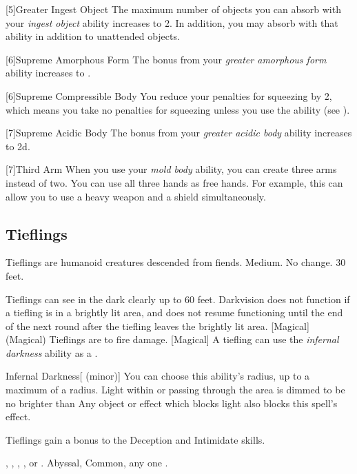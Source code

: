             [5]{Greater Ingest Object} The maximum number of objects you can absorb with your \textit{ingest object} ability increases to 2.
            In addition, you may absorb  with that ability in addition to unattended objects.

            [6]{Supreme Amorphous Form} The bonus from your \textit{greater amorphous form} ability increases to .

            [6]{Supreme Compressible Body} You reduce your penalties for squeezing by 2, which means you take no penalties for squeezing unless you use the  ability (see ).

            [7]{Supreme Acidic Body} The bonus from your \textit{greater acidic body} ability increases to \plus2d.

            [7]{Third Arm} When you use your \textit{mold body} ability, you can create three arms instead of two.
            You can use all three hands as free hands.
            For example, this can allow you to use a heavy weapon and a shield simultaneously.

    \subsection{Tieflings}

        Tieflings are humanoid creatures descended from fiends.
         Medium.
         No change.
         30 feet.
        \begin{itemize}
             Tieflings can see in the dark clearly up to 60 feet. Darkvision does not function if a tiefling is in a brightly lit area, and does not resume functioning until the end of the next round after the tiefling leaves the brightly lit area.
            [Magical] (Magical) Tieflings are  to fire damage.
            [Magical] A tiefling can use the \textit{infernal darkness} ability as a .
                \begin{durationability}{Infernal Darkness}[ (minor)]
                    \rankline
                    You can choose this ability's radius, up to a maximum of a \areamed radius.
                    Light within or passing through the area is dimmed to be no brighter than 
                    Any object or effect which blocks light also blocks this spell's effect.
                \end{durationability}
             Tieflings gain a  bonus to the Deception and Intimidate skills.
        \end{itemize}
         , , , , or .
         Abyssal, Common, any one .


